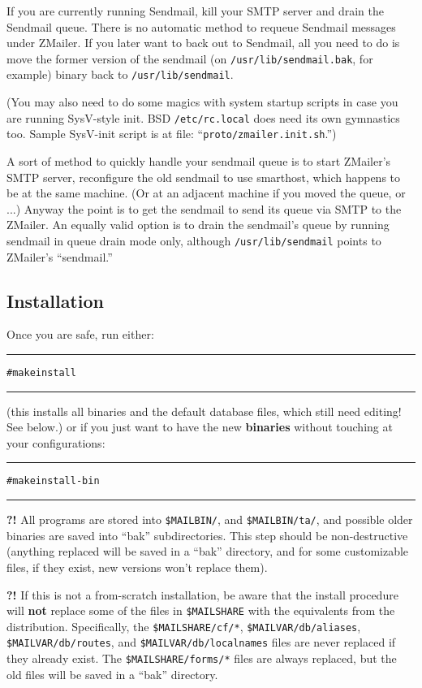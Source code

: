 If you are currently running Sendmail, kill your SMTP server
and drain the Sendmail queue.  There is no automatic method
to requeue Sendmail messages under ZMailer.  If you later want
to back out to Sendmail, all you need to do is move the former
version of the sendmail (on {\tt /usr/lib/sendmail.bak}, for example)
binary back to {\tt /usr/lib/sendmail}.

(You may also need to do some magics with system startup scripts
in case you are running SysV-style init. BSD {\tt /etc/rc.local}
does need its own gymnastics too.
Sample SysV-init script is at file: ``{\tt proto/zmailer.init.sh}.'')

A sort of method to quickly handle your sendmail queue is to
start ZMailer's SMTP server, reconfigure the old sendmail to
use smarthost, which happens to be at the same machine.
(Or at an adjacent machine if you moved the queue, or ...)
Anyway the point is to get the sendmail to send its queue
via SMTP to the ZMailer.
An equally valid option is to drain the sendmail's queue by running
sendmail in queue drain mode only, although {\tt /usr/lib/sendmail}
points to ZMailer's ``sendmail.''


\subsection{Installation}%

Once you are safe, run either:
\begin{alltt}\medskip\hrule\medskip
  # make install
\medskip\hrule\end{alltt}\medskip

(this installs all binaries and the default database files, which
still need editing! See below.)
or if you just want to have the new {\bf binaries} without touching
at your configurations:
\begin{alltt}\medskip\hrule\medskip
  # make install-bin
\medskip\hrule\end{alltt}\medskip

{\bf\Large ?!}
All programs are stored into  {\tt \$MAILBIN/}, and {\tt \$MAILBIN/ta/}, and
possible older binaries are saved into ``bak'' subdirectories.
This step should be non-destructive (anything replaced will be
saved in a ``bak'' directory, and {\sf for some customizable files, if
they exist, new versions won't replace them}).

{\bf\Large ?!}{\sloppy
If this is not a from-scratch installation, be aware that the install
procedure will {\bf not} replace some of the files in {\tt \$MAILSHARE}
with the equivalents from the distribution.
Specifically, the {\tt \$MAILSHARE/cf/*}, {\tt \$MAILVAR/db/aliases},
{\tt \$MAILVAR/db/routes}, and {\tt \$MAILVAR/db/localnames} files are
never replaced if they already exist.
The {\tt \$MAILSHARE/forms/*} files are always replaced, but the
old files will be saved in a ``bak'' directory.
}

